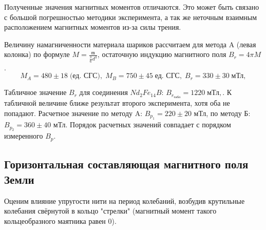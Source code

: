 \documentclass[a4paper,12pt]{article}
\begin{document}
Полученные значения магнитных моментов отличаются. Это может быть связано с большой погрешностью методики эксперимента, а так же неточным взаимным расположением магнитных моментов из-за силы трения.

Величину намагниченности материала шариков рассчитаем для метода A (левая колонка) по формуле $M = \frac{\mathfrak{m}}{\frac{\pi}{6} d^3}$, остаточную индукцию магнитного поля $B_r = 4\pi M$. $$M_A = 480 \pm 18 \; \text{(ед. СГС)}, \;M_B = 750\pm45\; \text{ед. СГС},\; B_r = 330 \pm 30 \; \text{мТл}, $$

Табличное значение $B_r$ для соединения $Nd_2Fe_{14}B$:
$B_{r_{\text{табл}}} = 1220 \; \text{мТл},$. К табличной величине ближе результат второго эксперимента,
хотя оба не попадают.
Расчетное значение по методу A: $B_{p_1} = 220 \pm 20$ мТл, по методу Б: $B_{p_2} = 360\pm40$ мТл.
Порядок расчетных значений совпадает с порядком измеренного $B_p$.

\subsection{Горизонтальная составляющая магнитного поля Земли}

Оценим влияние упругости нити на период колебаний, возбудив крутильные колебания свёрнутой в кольцо "стрелки" (магнитный момент такого кольцеобразного маятника равен 0).
\end{document}

